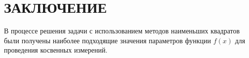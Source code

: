 \section*{ЗАКЛЮЧЕНИЕ}

В процессе решения задачи с использованием методов наименьших квадратов были
получены наиболее подходящие значения параметров функции $ f(x) $ для
проведения косвенных измерений.

\newpage
